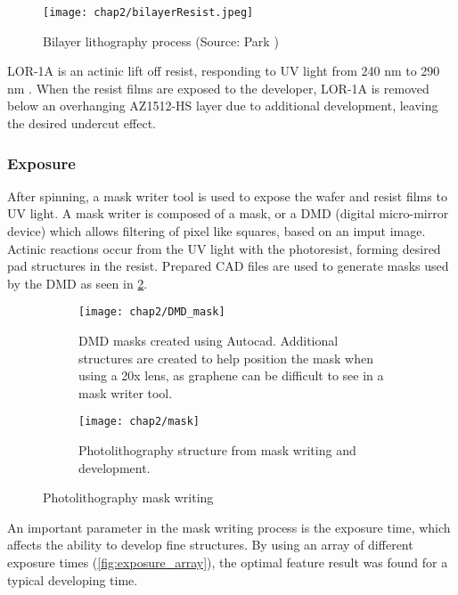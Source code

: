 \documentclass[../../Matt_Gebert_Honours_Thesis.tex]{subfiles}
\begin{document}
	\begin{figure}[H]
		\centering
		\texttt{[image: chap2/bilayerResist.jpeg]}
		\caption[Bilayer lithography process]{Bilayer lithography process (Source: Park \etal\cite{park_bilayer_2008}) }\label{fig:bilayer_lithography}
	\end{figure}
	
	LOR-1A is an actinic lift off resist, responding to UV light from 240 nm to 290 nm \cite{microchem_lor1a}. When the resist films are exposed to the developer, LOR-1A is removed below an overhanging AZ1512-HS layer due to additional development, leaving the desired undercut effect.
	
	\subsubsection{Exposure}\label{sec:exposure}
	After spinning, a mask writer tool is used to expose the wafer and resist films to UV light. A mask writer is composed of a mask, or a DMD (digital micro-mirror device) which allows filtering of pixel like squares, based on an imput image. Actinic reactions occur from the UV light with the photoresist, forming desired pad structures in the resist. Prepared CAD files are used to generate masks used by the DMD as seen in \cref{fig:DMD_mask}.
	
	\begin{figure}
		\centering
		\begin{subfigure}{0.65\textwidth}
			\texttt{[image: chap2/DMD\_mask]}
			\caption[DMD masks created using Autocad\texttrademark.]{DMD masks created using Autocad\texttrademark. Additional structures are created to help position the mask when using a 20x lens, as graphene can be difficult to see in a mask writer tool.}
		\end{subfigure}
		\hspace{0.02\textwidth}
		\begin{subfigure}{0.3\textwidth}
			\texttt{[image: chap2/mask]}
			\caption[Photolithography structure]{Photolithography structure from mask writing and development.}
		\end{subfigure}
		\caption{Photolithography mask writing}\label{fig:DMD_mask}
	\end{figure}
	
	An important parameter in the mask writing process is the exposure time, which affects the ability to develop fine structures. By using an array of different exposure times (\cref{fig:exposure_array}), the optimal feature result was found for a typical developing time.
	
\end{document}
